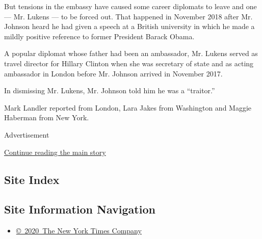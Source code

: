 But tensions in the embassy have caused some career diplomats to leave
and one --- Mr. Lukens --- to be forced out. That happened in November
2018 after Mr. Johnson heard he had given a speech at a British
university in which he made a mildly positive reference to former
President Barack Obama.

A popular diplomat whose father had been an ambassador, Mr. Lukens
served as travel director for Hillary Clinton when she was secretary of
state and as acting ambassador in London before Mr. Johnson arrived in
November 2017.

In dismissing Mr. Lukens, Mr. Johnson told him he was a ``traitor.''

Mark Landler reported from London, Lara Jakes from Washington and Maggie
Haberman from New York.

Advertisement

\protect\hyperlink{after-bottom}{Continue reading the main story}

\hypertarget{site-index}{%
\subsection{Site Index}\label{site-index}}

\hypertarget{site-information-navigation}{%
\subsection{Site Information
Navigation}\label{site-information-navigation}}

\begin{itemize}
\tightlist
\item
  \href{https://help.nytimes.com/hc/en-us/articles/115014792127-Copyright-notice}{©~2020~The
  New York Times Company}
\end{itemize}

